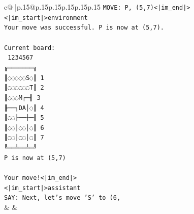 \documentclass{article}
\begin{document}
{\begin{supertabular}{c@{$\;$}|p{.15\linewidth}@{}p{.15\linewidth}p{.15\linewidth}p{.15\linewidth}p{.15\linewidth}p{.15\linewidth}}
{{{\texttt{MOVE: P, (5,7)<|im\_end|>} \\
\texttt{<|im\_start|>environment} \\
\texttt{Your move was successful. P is now at (5,7).} \\
\\ 
\texttt{Current board:} \\
\texttt{ 1234567} \\
\texttt{╔═══════╗} \\
\texttt{║◌◌◌◌◌S◌║ 1} \\
\texttt{║◌◌◌◌◌◌T║ 2} \\
\texttt{║◌◌◌M┌─╢ 3} \\
\texttt{╟──┐DA│◌║ 4} \\
\texttt{║◌◌├──┼─╢ 5} \\
\texttt{║◌◌│◌◌│◌║ 6} \\
\texttt{║◌◌│◌◌│◌║ 7} \\
\texttt{╚══╧══╧═╝} \\
\texttt{P is now at (5,7)} \\
\\ 
\texttt{Your move!<|im\_end|>} \\
\texttt{<|im\_start|>assistant} \\
\texttt{SAY: Next, let's move 'S' to (6,} \\
            }
        }
    }
    & & \\ \\


\end{supertabular}}
\end{document}
